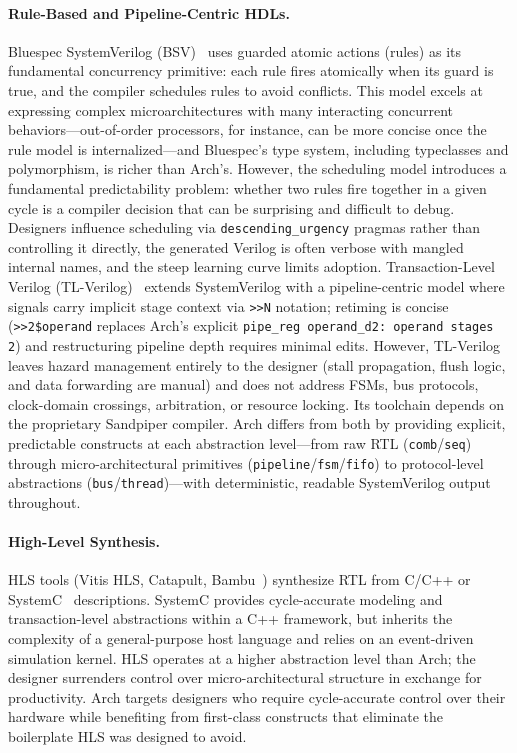\documentclass[11pt,twocolumn]{article}
\begin{document}
\paragraph{Rule-Based and Pipeline-Centric HDLs.}
Bluespec SystemVerilog (BSV)~\cite{bluespec} uses guarded atomic actions (rules) as its fundamental concurrency primitive: each rule fires atomically when its guard is true, and the compiler schedules rules to avoid conflicts. This model excels at expressing complex microarchitectures with many interacting concurrent behaviors---out-of-order processors, for instance, can be more concise once the rule model is internalized---and Bluespec's type system, including typeclasses and polymorphism, is richer than Arch's. However, the scheduling model introduces a fundamental predictability problem: whether two rules fire together in a given cycle is a compiler decision that can be surprising and difficult to debug. Designers influence scheduling via \texttt{descending\_urgency} pragmas rather than controlling it directly, the generated Verilog is often verbose with mangled internal names, and the steep learning curve limits adoption. Transaction-Level Verilog (TL-Verilog)~\cite{tlverilog} extends SystemVerilog with a pipeline-centric model where signals carry implicit stage context via \texttt{>>N} notation; retiming is concise (\texttt{>>2\$operand} replaces Arch's explicit \texttt{pipe\_reg operand\_d2: operand stages 2}) and restructuring pipeline depth requires minimal edits. However, TL-Verilog leaves hazard management entirely to the designer (stall propagation, flush logic, and data forwarding are manual) and does not address FSMs, bus protocols, clock-domain crossings, arbitration, or resource locking. Its toolchain depends on the proprietary Sandpiper compiler. Arch differs from both by providing explicit, predictable constructs at each abstraction level---from raw RTL (\texttt{comb}/\texttt{seq}) through micro-architectural primitives (\texttt{pipeline}/\texttt{fsm}/\texttt{fifo}) to protocol-level abstractions (\texttt{bus}/\texttt{thread})---with deterministic, readable SystemVerilog output throughout.

\paragraph{High-Level Synthesis.}
HLS tools (Vitis HLS, Catapult, Bambu~\cite{bambu}) synthesize RTL from C/C++ or SystemC~\cite{systemc} descriptions. SystemC provides cycle-accurate modeling and transaction-level abstractions within a C++ framework, but inherits the complexity of a general-purpose host language and relies on an event-driven simulation kernel. HLS operates at a higher abstraction level than Arch; the designer surrenders control over micro-architectural structure in exchange for productivity. Arch targets designers who require cycle-accurate control over their hardware while benefiting from first-class constructs that eliminate the boilerplate HLS was designed to avoid.
\end{document}
